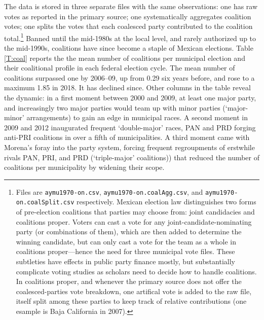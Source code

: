 \documentclass[letter,12pt]{article}
\begin{document}
The data is stored in three separate files with the same observations: one has raw votes as reported in the primary source; one systematically aggregates coalition votes; one splits the votes that each coalesced party contributed to the coalition total.\footnote{Files are \verb|aymu1970-on.csv|, \verb|aymu1970-on.coalAgg.csv|, and \verb|aymu1970-on.coalSplit.csv| respectively. Mexican election law distinguishes two forms of pre-election coalitions that parties may choose from: joint candidacies and coalitions proper. Voters can cast a vote for any joint-candidate-nominating party (or combinations of them), which are then added to determine the winning candidate, but can only cast a vote for the team as a whole in coalitions proper---hence the need for three municipal vote files. These subtleties have effects in public party finance mostly, but substantially complicate voting studies as scholars need to decide how to handle coalitions. In coalitions proper, and whenever the primary source does not offer the coalesced-parties vote breakdown, one artifical vote is added to the raw file, itself split among these parties to keep track of relative contributions (one esample is Baja California in 2007).} Banned until the mid-1980s at the local level, and rarely authorized up to the mid-1990s, coalitions have since become a staple of Mexican elections. Table \ref{T:coal} reports the the mean number of coalitions per municipal election and their coalitional profile in each federal election cycle. The mean number of coalitions surpassed one by 2006--09, up from 0.29 six years before, and rose to a maximum 1.85 in 2018. It has declined since. Other columns in the table reveal the dynamic: in a first moment between 2000 and 2009, at least one major party, and increasingly two major parties would team up with minor parties (`major-minor' arrangements) to gain an edge in municipal races. A second moment in 2009 and 2012 inaugurated frequent `double-major' races, PAN and PRD forging anti-PRI coalitions in over a fifth of municipalities. A third moment came with Morena's foray into the party system, forcing frequent regroupments of erstwhile rivals PAN, PRI, and PRD (`triple-major' coalitions)) that reduced the number of coalitions per municipality by widening their scope. 
\end{document}

